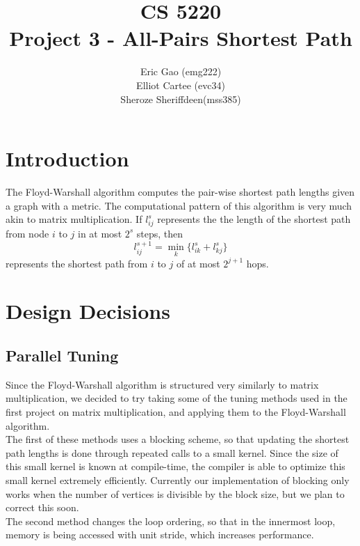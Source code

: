 \documentclass[11pt]{article}
\begin{document}
\title{CS 5220\\ Project 3 - All-Pairs Shortest Path}
\author{Eric Gao (emg222)\\ Elliot Cartee (evc34)\\ Sheroze Sheriffdeen(mss385)}
\maketitle

\section{Introduction}
The Floyd-Warshall algorithm computes the pair-wise shortest path lengths given a graph with a metric. The computational pattern of this algorithm is very much akin to matrix multiplication. If $l_{ij}^s$ represents the the length of the shortest path from node $i$ to $j$ in at most $2^s$ steps, then
\begin{equation}
	l_{ij}^{s+1} = \min_k \{ l_{ik}^s + l_{kj}^s \}
\end{equation} 
 represents the shortest path from $i$ to $j$ of at most $2^{j+1}$ hops. \cite{writeup} 
\section{Design Decisions}
 
\subsection{Parallel Tuning}

Since the Floyd-Warshall algorithm is structured very similarly to matrix multiplication, we decided to try taking some of the tuning methods used in the first project on matrix multiplication, and applying them to the Floyd-Warshall algorithm. \\

The first of these methods uses a blocking scheme, so that updating the shortest path lengths is done through repeated calls to a small kernel. Since the size of this small kernel is known at compile-time, the compiler is able to optimize this small kernel extremely efficiently. Currently our implementation of blocking only works when the number of vertices is divisible by the block size, but we plan to correct this soon. \\

The second method changes the loop ordering, so that in the innermost loop, memory is being accessed with unit stride, which increases performance. \\
\end{document}
